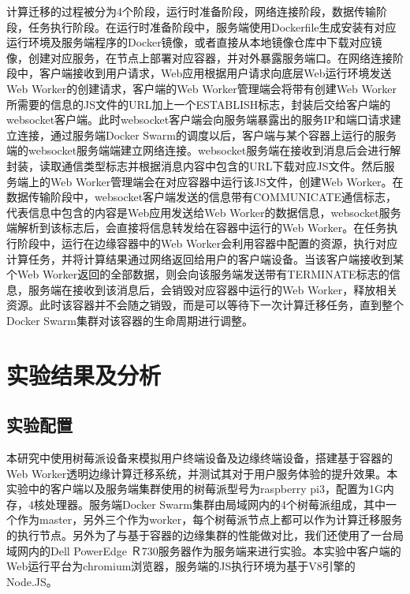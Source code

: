 计算迁移的过程被分为4个阶段，运行时准备阶段，网络连接阶段，数据传输阶段，任务执行阶段。在运行时准备阶段中，服务端使用Dockerfile生成安装有对应运行环境及服务端程序的Docker镜像，或者直接从本地镜像仓库中下载对应镜像，创建对应服务，在节点上部署对应容器，并对外暴露服务端口。在网络连接阶段中，客户端接收到用户请求，Web应用根据用户请求向底层Web运行环境发送Web Worker的创建请求，客户端的Web Worker管理端会将带有创建Web Worker所需要的信息的JS文件的URL加上一个ESTABLISH标志，封装后交给客户端的websocket客户端。此时websocket客户端会向服务端暴露出的服务IP和端口请求建立连接，通过服务端Docker Swarm的调度以后，客户端与某个容器上运行的服务端的websocket服务端端建立网络连接。websocket服务端在接收到消息后会进行解封装，读取通信类型标志并根据消息内容中包含的URL下载对应JS文件。然后服务端上的Web Worker管理端会在对应容器中运行该JS文件，创建Web Worker。在数据传输阶段中，websocket客户端发送的信息带有COMMUNICATE通信标志，代表信息中包含的内容是Web应用发送给Web Worker的数据信息，websocket服务端解析到该标志后，会直接将信息转发给在容器中运行的Web Worker。在任务执行阶段中，运行在边缘容器中的Web Worker会利用容器中配置的资源，执行对应计算任务，并将计算结果通过网络返回给用户的客户端设备。当该客户端接收到某个Web Worker返回的全部数据，则会向该服务端发送带有TERMINATE标志的信息，服务端在接收到该消息后，会销毁对应容器中运行的Web Worker，释放相关资源。此时该容器并不会随之销毁，而是可以等待下一次计算迁移任务，直到整个Docker Swarm集群对该容器的生命周期进行调整。

\section{实验结果及分析}\label{sec:computation_offloading_experiment_results}

\subsection{实验配置}

本研究中使用树莓派设备来模拟用户终端设备及边缘终端设备，搭建基于容器的Web Worker透明边缘计算迁移系统，并测试其对于用户服务体验的提升效果。本实验中的客户端以及服务端集群使用的树莓派型号为raspberry pi3，配置为1G内存，4核处理器。服务端Docker Swarm集群由局域网内的4个树莓派组成，其中一个作为master，另外三个作为worker，每个树莓派节点上都可以作为计算迁移服务的执行节点。另外为了与基于容器的边缘集群的性能做对比，我们还使用了一台局域网内的Dell PowerEdge Ｒ730服务器作为服务端来进行实验。本实验中客户端的Web运行平台为chromium浏览器，服务端的JS执行环境为基于V8引擎的Node.JS。

